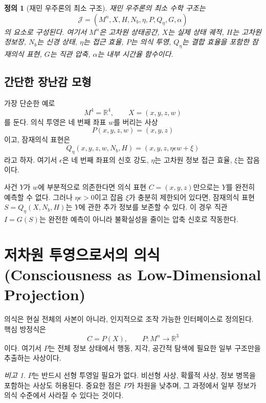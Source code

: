 \documentclass[11pt]{article}
\newtheorem{definition}{정의}
\theoremstyle{remark}
\newtheorem{remark}{비고}
\begin{document}
\begin{definition}[재민 우주론의 최소 구조]
재민 우주론의 최소 수학 구조는
\begin{equation}
  \mathcal{J} = \left(M^n, X, H, N_b, \eta, P, Q_\eta, G, \alpha\right)
\end{equation}
의 요소로 구성된다. 여기서 $M^n$은 고차원 상태공간, $X$는 실제 상태 궤적,
$H$는 고차원 정보장, $N_b$는 신경 상태, $\eta$는 접근 효율, $P$는 의식
투영, $Q_\eta$는 결합 효율을 포함한 잠재의식 표현, $G$는 직관 압축,
$\alpha$는 내부 시간율 함수이다.
\end{definition}

\subsection{간단한 장난감 모형}

가장 단순한 예로
\begin{equation}
  M^4=\mathbb{R}^4,\qquad X=(x,y,z,w)
\end{equation}
를 둔다. 의식 투영은 네 번째 좌표 $w$를 버리는 사상
\begin{equation}
  P(x,y,z,w)=(x,y,z)
\end{equation}
이고, 잠재의식 표현은
\begin{equation}
  Q_\eta(x,y,z,w,N_b,H)=(x,y,z,\eta\epsilon w+\xi)
\end{equation}
라고 하자. 여기서 $\epsilon$은 네 번째 좌표의 신호 강도, $\eta$는
고차원 정보 접근 효율, $\xi$는 잡음이다.

사건 $Y$가 $w$에 부분적으로 의존한다면 의식 표현 $C=(x,y,z)$만으로는
$Y$를 완전히 예측할 수 없다. 그러나 $\eta\epsilon>0$이고 잡음 $\xi$가 충분히
제한되어 있다면, 잠재의식 표현 $S=Q_\eta(X,N_b,H)$는 $Y$에 관한 추가 정보를 보존할
수 있다. 이 경우 직관 $I=G(S)$는 완전한 예측이 아니라 불확실성을 줄이는
압축 신호로 작동한다.

\section{저차원 투영으로서의 의식 (Consciousness as Low-Dimensional Projection)}

의식은 현실 전체의 사본이 아니라, 인지적으로 조작 가능한 인터페이스로
정의된다. 핵심 방정식은
\begin{equation}
  C=P(X), \qquad P:M^n\to\mathbb{R}^3
\end{equation}
이다. 여기서 $P$는 전체 정보 상태에서 행동, 지각, 공간적 탐색에 필요한
일부 구조만을 추출하는 사상이다.

\begin{remark}
$P$는 반드시 선형 투영일 필요가 없다. 비선형 사상, 확률적 사상,
정보 병목을 포함하는 사상도 허용된다. 중요한 점은 $P$가 차원을 낮추며,
그 과정에서 일부 정보가 의식 수준에서 사라질 수 있다는 것이다.
\end{remark}
\end{document}
